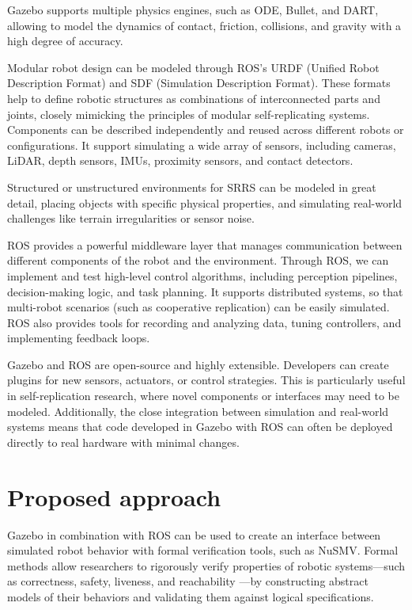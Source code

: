 Gazebo supports multiple physics engines, such as 
ODE, Bullet, and DART, allowing to model the dynamics of contact,
friction, collisions, and gravity with a high degree of accuracy. 

Modular robot design  can be modeled through ROS’s URDF (Unified Robot 
Description Format) and SDF (Simulation Description Format). These formats 
help to define robotic structures as combinations of interconnected 
parts and joints, closely mimicking the principles of modular self-replicating 
systems. Components can be described independently and reused across different 
robots or configurations. It support simulating a wide array of sensors, including
cameras, LiDAR, depth sensors, IMUs, proximity sensors, and contact detectors. 

Structured or unstructured environments for SRRS can be modeled in great detail,
placing objects with specific physical properties, and simulating real-world 
challenges like terrain irregularities or sensor noise.

ROS provides a powerful middleware layer that manages communication between 
different components of the robot and the environment. 
Through ROS, we can implement and test high-level control algorithms, including perception 
pipelines, decision-making logic, and task planning.
It supports distributed systems, so that multi-robot scenarios 
(such as cooperative replication) can be easily simulated. 
ROS also provides tools for recording and analyzing 
data, tuning controllers, and implementing feedback loops. 

Gazebo and ROS are open-source and highly extensible. Developers can create 
plugins for new sensors, actuators, or control strategies. This is particularly 
useful in self-replication research, where novel components or interfaces 
may need to be modeled. 
Additionally, the close integration between simulation 
and real-world systems means that code developed in Gazebo with ROS can 
often be deployed directly to real hardware with minimal changes. 


\section{Proposed approach}
Gazebo in combination with ROS can be used to create an interface between
simulated robot behavior with formal verification 
tools, such as NuSMV. Formal methods allow researchers to rigorously verify 
properties of robotic systems—such as correctness, safety, liveness, and reachability
—by constructing abstract models of their behaviors and validating them against 
logical specifications.

